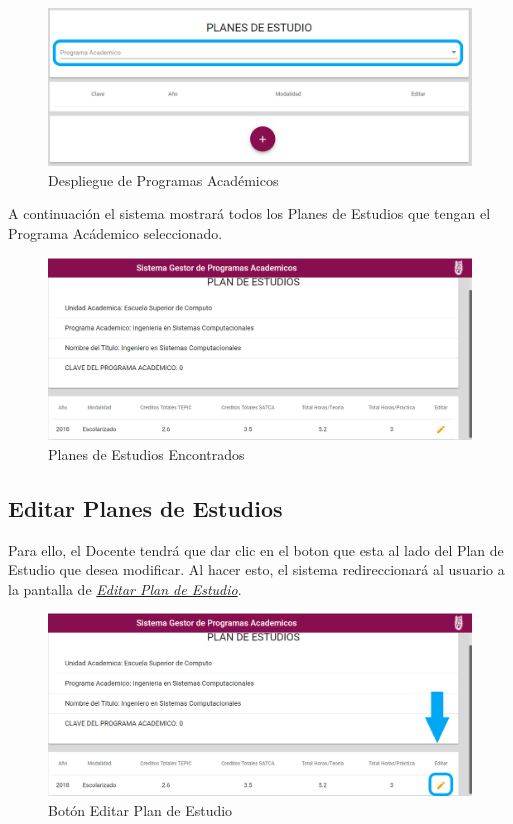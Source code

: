 \begin{figure}[!hbtp]
	\centering
	\hypertarget{academico2}{\includegraphics[width=0.7\linewidth]{images/SP4-GPE/programa}}
	\caption{Despliegue de Programas Académicos}
	\label{academico2}
\end{figure}

A continuación el sistema mostrará todos los Planes de Estudios que tengan el Programa Acádemico seleccionado.
\begin{figure}[!hbtp]
	\centering
	\hypertarget{planes}{\includegraphics[width=0.7\linewidth]{images/SP4-GPE/planes}}
	\caption{Planes de Estudios Encontrados}
	\label{planes}
\end{figure}
\newpage
\subsection{Editar Planes de Estudios}

Para ello, el Docente tendrá que dar clic en el boton  que esta al lado del Plan de Estudio que desea modificar. Al hacer esto, el sistema redireccionará al usuario a la pantalla de \hyperlink{editarPE}{\textit{Editar Plan de Estudio}}.

\begin{figure}[!hbtp]
	\centering
	\hypertarget{editar}{\includegraphics[width=0.7\linewidth]{images/SP4-GPE/editarC}}
	\caption{Botón Editar Plan de Estudio}
	\label{editar}
\end{figure}

